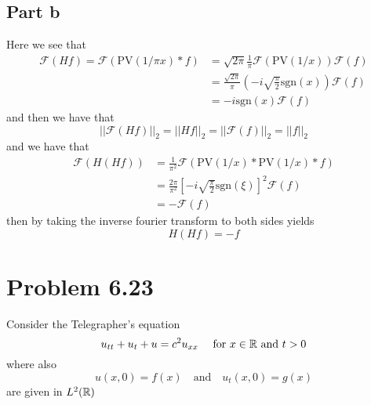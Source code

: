 \documentclass[12pt]{report}
\newcommand{\norm}[1]{\left|\left|#1\right|\right|}
\begin{document}
\subsection*{Part b}
Here we see that
\begin{align*}
    \mathcal{F}(Hf) = \mathcal{F}(\text{PV}(1/\pi x) * f) &= \sqrt{2\pi} \frac{1}{\pi}\mathcal{F}(\text{PV}(1/x))\mathcal{F}(f) \\
    &= \frac{\sqrt{2\pi}}{\pi}\left(-i \sqrt{\frac{\pi}{2}} \text{sgn}(x)\right) \mathcal{F}(f) \\
    &= -i \text{sgn}(x) \mathcal{F}(f)
\end{align*}
and then we have that
\begin{equation*}
    \norm{\mathcal{F}(Hf)}_2 = \norm{Hf}_2 = \norm{\mathcal{F}(f)}_2 = \norm{f}_2
\end{equation*}
and we have that
\begin{align*}
    \mathcal{F}(H(Hf)) &= \frac{1}{\pi^2} \mathcal{F}(\text{PV}(1/x) * \text{PV}(1/x) * f) \\
    &= \frac{2\pi}{\pi^2}\left[-i \sqrt{\frac{\pi}{2}} \text{sgn}(\xi)\right]^2 \mathcal{F}(f) \\
    &= -\mathcal{F}(f)
\end{align*}
then by taking the inverse fourier transform to both sides yields
\begin{equation*}
    H(Hf) = -f
\end{equation*}

\section*{Problem 6.23}
Consider the Telegrapher's equation
\begin{equation*}
    u_{tt} + u_t + u = c^2u_{xx} \quad \text{ for $x \in \mathbb{R}$ and $t > 0$}
\end{equation*}
where also
\begin{equation*}
    u(x,0) = f(x) \quad \text{and} \quad u_t(x,0) = g(x)
\end{equation*}
are given in $L^2(\mathbb{R})$
\end{document}
